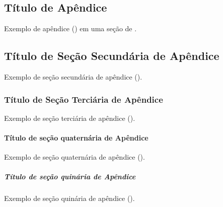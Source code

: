 \begin{Appendix}

\section{Título de Apêndice}%
\label{sect:apx-a1}

Exemplo de apêndice () em uma seção de .

\subsection{Título de Seção Secundária de Apêndice}%
\label{ssect:apx-a2}

Exemplo de seção secundária de apêndice ().

\subsubsection{Título de Seção Terciária de Apêndice}%
\label{sssect:apx-a3}

Exemplo de seção terciária de apêndice ().

\paragraph{Título de seção quaternária de Apêndice}%
\label{prgh:apx-a4}

Exemplo de seção quaternária de apêndice ().

\subparagraph{Título de seção quinária de Apêndice}%
\label{sprgh:apx-a5}

Exemplo de seção quinária de apêndice ().

\end{Appendix}

